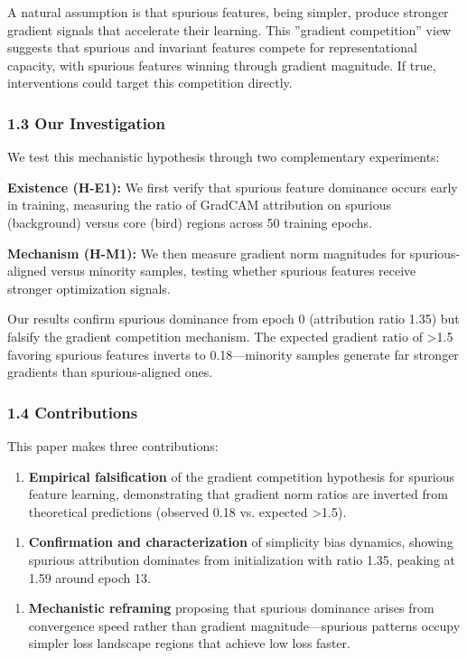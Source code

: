 A natural assumption is that spurious features, being simpler, produce stronger gradient signals that accelerate their learning. This ''gradient competition'' view suggests that spurious and invariant features compete for representational capacity, with spurious features winning through gradient magnitude. If true, interventions could target this competition directly.

\subsubsection{1.3 Our Investigation}

We test this mechanistic hypothesis through two complementary experiments:

\textbf{Existence (H-E1):} We first verify that spurious feature dominance occurs early in training, measuring the ratio of GradCAM attribution on spurious (background) versus core (bird) regions across 50 training epochs.

\textbf{Mechanism (H-M1):} We then measure gradient norm magnitudes for spurious-aligned versus minority samples, testing whether spurious features receive stronger optimization signals.

Our results confirm spurious dominance from epoch 0 (attribution ratio 1.35) but falsify the gradient competition mechanism. The expected gradient ratio of >1.5 favoring spurious features inverts to 0.18---minority samples generate far stronger gradients than spurious-aligned ones.

\subsubsection{1.4 Contributions}

This paper makes three contributions:

\begin{enumerate}
\item \textbf{Empirical falsification} of the gradient competition hypothesis for spurious feature learning, demonstrating that gradient norm ratios are inverted from theoretical predictions (observed 0.18 vs. expected >1.5).
\end{enumerate}

\begin{enumerate}
\item \textbf{Confirmation and characterization} of simplicity bias dynamics, showing spurious attribution dominates from initialization with ratio 1.35, peaking at 1.59 around epoch 13.
\end{enumerate}

\begin{enumerate}
\item \textbf{Mechanistic reframing} proposing that spurious dominance arises from convergence speed rather than gradient magnitude---spurious patterns occupy simpler loss landscape regions that achieve low loss faster.
\end{enumerate}
